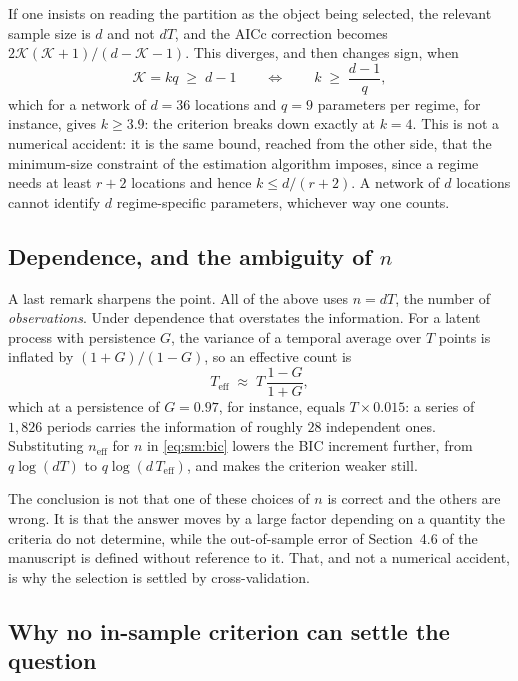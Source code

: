 \documentclass[11pt]{article}
\begin{document}
If one insists on reading the partition as the object being selected, the relevant sample size is $d$ and not $dT$, and the AICc correction becomes $2\mathcal{K}(\mathcal{K}+1)/(d - \mathcal{K} - 1)$. This diverges, and then changes sign, when
\begin{equation}\label{eq:sm:bound}
  \mathcal{K} = kq \;\ge\; d - 1
  \qquad\Longleftrightarrow\qquad
  k \;\ge\; \frac{d-1}{q},
\end{equation}
which for a network of $d = 36$ locations and $q = 9$ parameters per regime, for instance, gives $k \ge 3.9$: the criterion breaks down exactly at $k = 4$. This is not a numerical accident: it is the same bound, reached from the other side, that the minimum-size constraint of the estimation algorithm imposes, since a regime needs at least $r+2$ locations and hence $k \le d/(r+2)$. A network of $d$ locations cannot identify $d$ regime-specific parameters, whichever way one counts.

\subsection{Dependence, and the ambiguity of \texorpdfstring{$n$}{n}}

A last remark sharpens the point. All of the above uses $n = dT$, the number of \emph{observations}. Under dependence that overstates the information. For a latent process with persistence $G$, the variance of a temporal average over $T$ points is inflated by $(1+G)/(1-G)$, so an effective count is
\begin{equation}\label{eq:sm:neff}
  T_{\mathrm{eff}} \;\approx\; T\,\frac{1-G}{1+G},
\end{equation}
which at a persistence of $G = 0.97$, for instance, equals $T \times 0.015$: a series of $1{,}826$ periods carries the information of roughly $28$ independent ones. Substituting $n_{\mathrm{eff}}$ for $n$ in \eqref{eq:sm:bic} lowers the BIC increment further, from $q\log(dT)$ to $q\log(d\,T_{\mathrm{eff}})$, and makes the criterion weaker still.

The conclusion is not that one of these choices of $n$ is correct and the others are wrong. It is that the answer moves by a large factor depending on a quantity the criteria do not determine, while the out-of-sample error of Section~4.6 of the manuscript is defined without reference to it. That, and not a numerical accident, is why the selection is settled by cross-validation.

\subsection{Why no in-sample criterion can settle the question}
\end{document}
